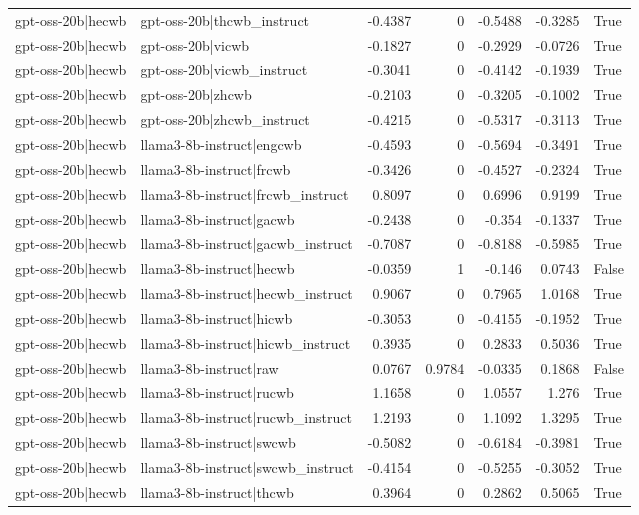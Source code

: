 \begin{table}
\begin{tabular}{l l r r r r l}
gpt-oss-20b|hecwb & gpt-oss-20b|thcwb_instruct & -0.4387 & 0 & -0.5488 & -0.3285 & True \\
gpt-oss-20b|hecwb & gpt-oss-20b|vicwb & -0.1827 & 0 & -0.2929 & -0.0726 & True \\
gpt-oss-20b|hecwb & gpt-oss-20b|vicwb_instruct & -0.3041 & 0 & -0.4142 & -0.1939 & True \\
gpt-oss-20b|hecwb & gpt-oss-20b|zhcwb & -0.2103 & 0 & -0.3205 & -0.1002 & True \\
gpt-oss-20b|hecwb & gpt-oss-20b|zhcwb_instruct & -0.4215 & 0 & -0.5317 & -0.3113 & True \\
gpt-oss-20b|hecwb & llama3-8b-instruct|engcwb & -0.4593 & 0 & -0.5694 & -0.3491 & True \\
gpt-oss-20b|hecwb & llama3-8b-instruct|frcwb & -0.3426 & 0 & -0.4527 & -0.2324 & True \\
gpt-oss-20b|hecwb & llama3-8b-instruct|frcwb_instruct & 0.8097 & 0 & 0.6996 & 0.9199 & True \\
gpt-oss-20b|hecwb & llama3-8b-instruct|gacwb & -0.2438 & 0 & -0.354 & -0.1337 & True \\
gpt-oss-20b|hecwb & llama3-8b-instruct|gacwb_instruct & -0.7087 & 0 & -0.8188 & -0.5985 & True \\
gpt-oss-20b|hecwb & llama3-8b-instruct|hecwb & -0.0359 & 1 & -0.146 & 0.0743 & False \\
gpt-oss-20b|hecwb & llama3-8b-instruct|hecwb_instruct & 0.9067 & 0 & 0.7965 & 1.0168 & True \\
gpt-oss-20b|hecwb & llama3-8b-instruct|hicwb & -0.3053 & 0 & -0.4155 & -0.1952 & True \\
gpt-oss-20b|hecwb & llama3-8b-instruct|hicwb_instruct & 0.3935 & 0 & 0.2833 & 0.5036 & True \\
gpt-oss-20b|hecwb & llama3-8b-instruct|raw & 0.0767 & 0.9784 & -0.0335 & 0.1868 & False \\
gpt-oss-20b|hecwb & llama3-8b-instruct|rucwb & 1.1658 & 0 & 1.0557 & 1.276 & True \\
gpt-oss-20b|hecwb & llama3-8b-instruct|rucwb_instruct & 1.2193 & 0 & 1.1092 & 1.3295 & True \\
gpt-oss-20b|hecwb & llama3-8b-instruct|swcwb & -0.5082 & 0 & -0.6184 & -0.3981 & True \\
gpt-oss-20b|hecwb & llama3-8b-instruct|swcwb_instruct & -0.4154 & 0 & -0.5255 & -0.3052 & True \\
gpt-oss-20b|hecwb & llama3-8b-instruct|thcwb & 0.3964 & 0 & 0.2862 & 0.5065 & True \\

\end{tabular}
\end{table}
